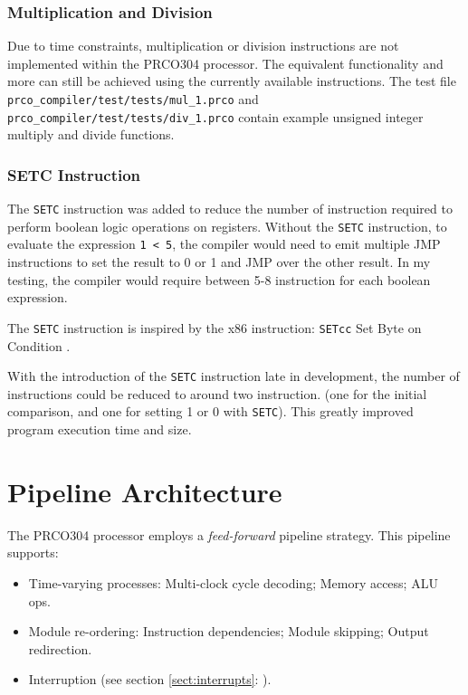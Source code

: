 \documentclass[11pt,a4paper]{report}
\newcommand{\scname}{PRCO304}
\begin{document}
\subsubsection*{Multiplication and Division}
Due to time constraints, multiplication or division instructions are not implemented within the \scname{} processor. The equivalent functionality and more can still be achieved using the currently available instructions. The test file \verb|prco_compiler/test/tests/mul_1.prco| and \verb|prco_compiler/test/tests/div_1.prco| contain example unsigned integer multiply and divide functions.

\subsubsection*{SETC Instruction}
The \verb|SETC| instruction was added to reduce the number of instruction required to perform boolean logic operations on registers. Without the \verb|SETC| instruction, to evaluate the expression \texttt{1 < 5}, the compiler would need to emit multiple JMP instructions to set the result to 0 or 1 and JMP over the other result. In my testing, the compiler would require between 5-8 instruction for each boolean expression. 

The \verb|SETC| instruction is inspired by the x86 instruction: \verb|SETcc| Set Byte on Condition \citep{isa_x86}.

With the introduction of the \verb|SETC| instruction late in development, the number of instructions could be reduced to around two instruction. (one for the initial comparison, and one for setting 1 or 0 with \verb|SETC|). This greatly improved program execution time and size.


\section{Pipeline Architecture}
The \scname{} processor employs a \textit{feed-forward} pipeline strategy. 
This pipeline supports:
\begin{itemize}
\item{Time-varying processes: Multi-clock cycle decoding; Memory access; ALU ops.}
\item{Module re-ordering: Instruction dependencies; Module skipping; Output redirection. }
\item{Interruption (see section \ref{sect:interrupts}: {}).}
\end{itemize}
\end{document}
